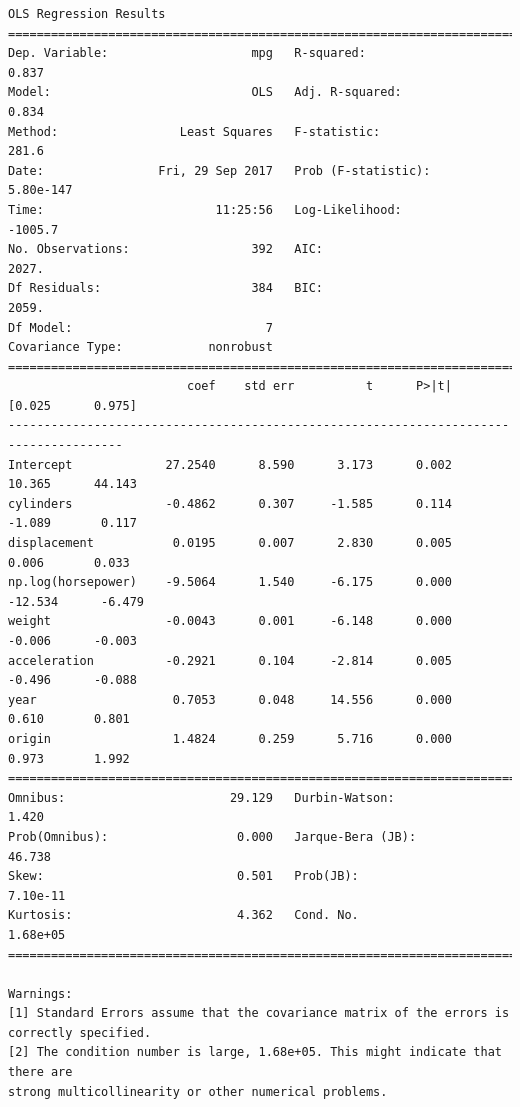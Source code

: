 \documentclass[11pt]{article}
\begin{document}
    \begin{Verbatim}[commandchars=\\\{\}]
                            OLS Regression Results                            
==============================================================================
Dep. Variable:                    mpg   R-squared:                       0.837
Model:                            OLS   Adj. R-squared:                  0.834
Method:                 Least Squares   F-statistic:                     281.6
Date:                Fri, 29 Sep 2017   Prob (F-statistic):          5.80e-147
Time:                        11:25:56   Log-Likelihood:                -1005.7
No. Observations:                 392   AIC:                             2027.
Df Residuals:                     384   BIC:                             2059.
Df Model:                           7                                         
Covariance Type:            nonrobust                                         
======================================================================================
                         coef    std err          t      P>|t|      [0.025      0.975]
--------------------------------------------------------------------------------------
Intercept             27.2540      8.590      3.173      0.002      10.365      44.143
cylinders             -0.4862      0.307     -1.585      0.114      -1.089       0.117
displacement           0.0195      0.007      2.830      0.005       0.006       0.033
np.log(horsepower)    -9.5064      1.540     -6.175      0.000     -12.534      -6.479
weight                -0.0043      0.001     -6.148      0.000      -0.006      -0.003
acceleration          -0.2921      0.104     -2.814      0.005      -0.496      -0.088
year                   0.7053      0.048     14.556      0.000       0.610       0.801
origin                 1.4824      0.259      5.716      0.000       0.973       1.992
==============================================================================
Omnibus:                       29.129   Durbin-Watson:                   1.420
Prob(Omnibus):                  0.000   Jarque-Bera (JB):               46.738
Skew:                           0.501   Prob(JB):                     7.10e-11
Kurtosis:                       4.362   Cond. No.                     1.68e+05
==============================================================================

Warnings:
[1] Standard Errors assume that the covariance matrix of the errors is correctly specified.
[2] The condition number is large, 1.68e+05. This might indicate that there are
strong multicollinearity or other numerical problems.

    \end{Verbatim}
\end{document}
